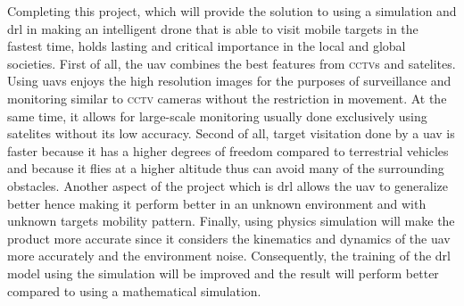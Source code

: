 \documentclass[../main.tex]{subfiles}
\begin{document}
Completing this project, which will provide the solution
to using a simulation and \gls{drl} in making an intelligent drone 
that is able to visit mobile targets in the fastest time,
holds lasting and critical importance 
in the local and global societies.
First of all, the \gls{uav} combines the best features
from \textsc{cctv}s and satelites.
Using \glspl{uav} enjoys the high resolution images
for the purposes of surveillance and monitoring
similar to \textsc{cctv} cameras without the restriction in movement.
At the same time, it allows for large-scale monitoring 
usually done exclusively using satelites without its low accuracy.
Second of all, target visitation done by a \gls{uav}
is faster because it has a higher degrees of freedom
compared to terrestrial vehicles and because
it flies at a higher altitude thus can avoid 
many of the surrounding obstacles.
Another aspect of the project which is \gls{drl} 
allows the \gls{uav} to generalize better
hence making it perform better in an unknown environment
and with unknown targets mobility pattern.
Finally, using physics simulation will make the product 
more accurate since it considers 
the kinematics and dynamics of the \gls{uav} more accurately
and the environment noise.
Consequently, the training of the \gls{drl} model 
using the simulation will be improved 
and the result will perform better
compared to using a mathematical simulation.
\end{document}
